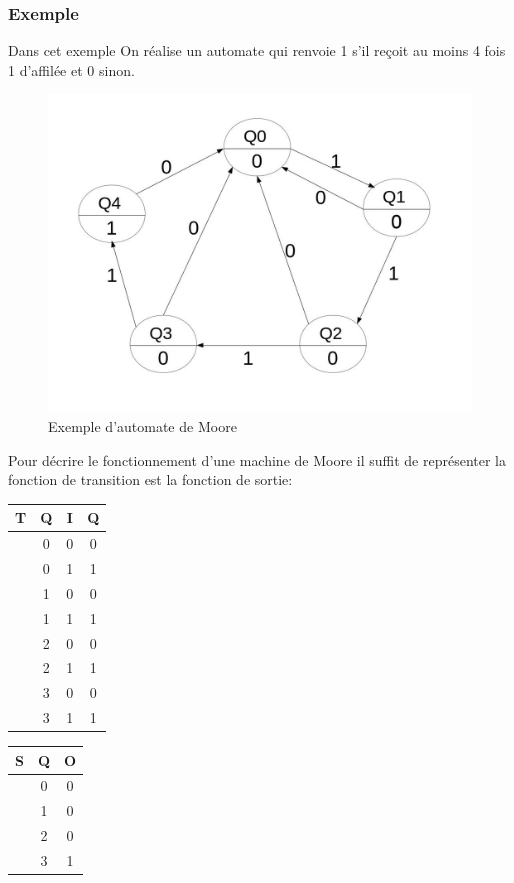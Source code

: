 \documentclass[10pt,a4paper,twoside]{article}
\begin{document}
\subsubsection{Exemple}
Dans cet exemple On réalise un automate qui renvoie 1 s'il reçoit au moins 4 fois 1 d'affilée et 0 sinon.

\begin{figure}[hbtp]
\caption{Exemple d'automate de Moore}
\centering
\includegraphics[scale=0.2]{Moore.jpg}
\end{figure}
\FloatBarrier

Pour décrire le fonctionnement d'une machine de Moore il suffit de représenter la fonction de transition est la fonction de sortie:

\begin{tabular}{c|ccc}
T & Q & I & Q \\ 
\hline 
 & 0 & 0 & 0 \\ 
 & 0 & 1 & 1 \\ 
 & 1 & 0 & 0 \\ 
 & 1 & 1 & 1 \\ 
 & 2 & 0 & 0 \\ 
 & 2 & 1 & 1 \\ 
 & 3 & 0 & 0 \\ 
 & 3 & 1 & 1 \\ 
\end{tabular} 
\begin{tabular}{c|cc}
S & Q & O \\ 
\hline 
 & 0 & 0 \\ 
 & 1 & 0 \\ 
 & 2 & 0 \\ 
 & 3 & 1 \\ 
\end{tabular} 
\end{document}
